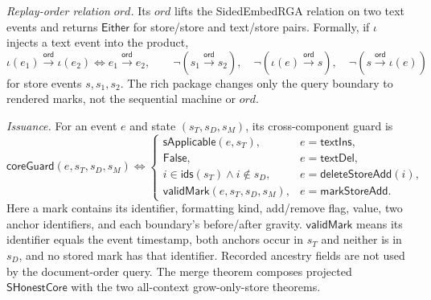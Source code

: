 \documentclass[11pt]{article}
\theoremstyle{definition}
\newcommand{\ord}{\mathrel{\xrightarrow{\mathsf{ord}}}}
\begin{document}
\emph{Replay-order relation $ord$.} Its $ord$ lifts the SidedEmbedRGA
relation on two text events and returns $\mathsf{Either}$ for store/store and
text/store pairs. Formally, if $\iota$ injects a text event into the product,
\[
 \iota(e_1)\ord\iota(e_2)\Longleftrightarrow e_1\ord e_2,
 \qquad
 \neg(s_1\ord s_2),\quad\neg(\iota(e)\ord s),\quad\neg(s\ord\iota(e))
\]
for store events $s,s_1,s_2$. The rich package changes only the query boundary
to rendered marks, not the sequential machine or $ord$.

\emph{Issuance.} For an event $e$ and state $(s_T,s_D,s_M)$, its cross-component guard
is
\[
\mathsf{coreGuard}(e,s_T,s_D,s_M)\Longleftrightarrow
\begin{cases}
 \mathsf{sApplicable}(e,s_T),&e=\mathsf{textIns},\\
 \mathsf{False},&e=\mathsf{textDel},\\
 i\in\mathsf{ids}(s_T)\land i\notin s_D,&e=\mathsf{deleteStoreAdd}(i),\\
 \mathsf{validMark}(e,s_T,s_D,s_M),&e=\mathsf{markStoreAdd}.
\end{cases}
\]
Here a mark contains its identifier, formatting kind, add/remove flag, value,
two anchor identifiers, and each boundary's before/after gravity.
$\mathsf{validMark}$ means its identifier equals the event timestamp, both
anchors occur in $s_T$ and neither is in $s_D$, and no stored mark has that
identifier. Recorded ancestry fields are not used by the document-order query.
The merge theorem composes projected $\mathsf{SHonestCore}$ with the two
all-context grow-only-store theorems.
\end{document}
